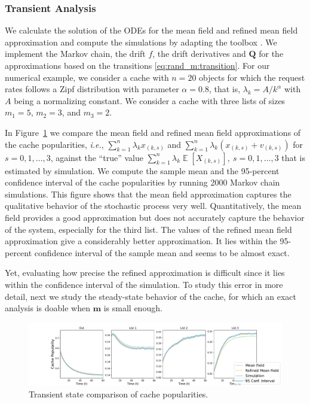 \documentclass[acmsmall]{acmart}
\newcommand\bm{\mathbf{m}}
\newcommand\bQ{\mathbf{Q}}
\DeclareMathOperator{\E}{\mathbb{E}} %
\begin{document}

\subsubsection{Transient Analysis}

We calculate the solution of the ODEs for the mean field and refined mean field approximation and compute the simulations by adapting the toolbox \cite{allmeier2021rmftool}. We implement the Markov chain, the drift $f$, the drift derivatives and $\bQ$ for the approximations based on the transitions \eqref{eq:rand_m:transition}. For our numerical example, we consider a cache with $n=20$ objects for which the request rates follows a Zipf distribution with parameter $\alpha=0.8$, that is, $\lambda_k = A / k^{\alpha}$ with $A$ being a normalizing constant. We consider a cache with three lists of sizes $m_1 = 5$, $m_2 = 3$, and $m_3 = 2$. 

In Figure~\ref{fig:transient_cache_popularities} we compare the mean field and refined mean field approximations of the cache popularities, \emph{i.e.}, $\sum_{k=1}^n \lambda_k x_{(k,s)}$ and $\sum_{k=1}^n \lambda_k (x_{(k,s)} + v_{(k,s)})$ for $s=0,1,\ldots, 3$, against the ``true'' value $\sum_{k=1}^n \lambda_k \E[X_{(k,s)}], \ s=0,1,\ldots, 3$ that is estimated by simulation. We compute the sample mean and the 95-percent confidence interval of the cache popularities by running 2000 Markov chain simulations. This figure shows that the mean field approximation captures the qualitative behavior of the stochastic process very well. Quantitatively, the mean field provides a good approximation but does not accurately capture the behavior of the system, especially for the third list. The values of the refined mean field approximation give a considerably better approximation. It lies within the 95-percent confidence interval of the sample mean and seems to be almost exact. 

Yet, evaluating how precise the refined approximation is difficult since it lies within the confidence interval of the simulation. To study this error in more detail, next we study the steady-state behavior of the cache, for which an exact analysis is doable when $\bm$ is small enough.

\begin{figure}[ht]
  \includegraphics[width=\textwidth]{popularities_caches.pdf}
  \caption{Transient state comparison of cache popularities.}
  \label{fig:transient_cache_popularities}
\end{figure}
\end{document}
